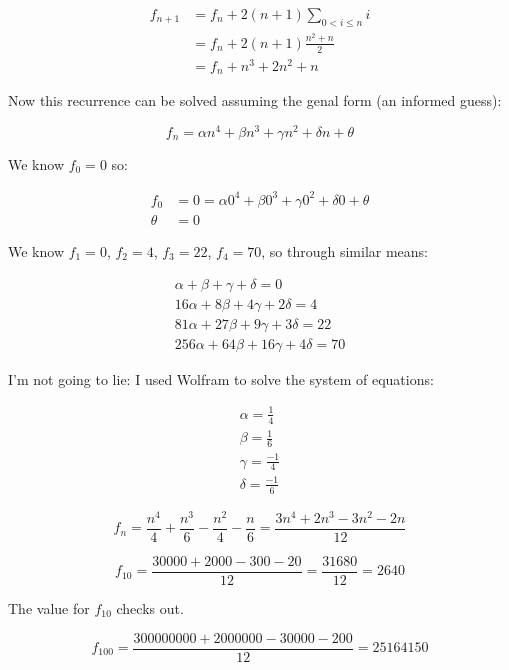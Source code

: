 \documentclass{article}
\begin{document}
\begin{align*}
    f_{n + 1} &= f_n + 2 (n + 1) \sum_{0 < i \le n} i
    \\
    &= f_n + 2 (n + 1) \frac{n^2 + n}{2}
    \\
    &= f_n + n^3 + 2n^2 + n
\end{align*}

Now this recurrence can be solved assuming the genal form (an informed guess):

\begin{equation*}
    f_n = \alpha n^4 + \beta n^3 + \gamma n^2 + \delta n + \theta
\end{equation*}

We know $f_0 = 0$ so:

\begin{align*}
    f_0 &= 0 = \alpha 0^4 + \beta 0^3 + \gamma 0^2 + \delta 0 + \theta
    \\
    \theta &= 0
\end{align*}

We know $f_1 = 0$, $f_2 = 4$, $f_3 = 22$, $f_4 = 70$, so through
 similar means:

\begin{align*}
    \alpha + \beta + \gamma + \delta = 0
    \\
    16 \alpha + 8 \beta + 4 \gamma + 2 \delta = 4
    \\
    81 \alpha + 27 \beta + 9 \gamma + 3 \delta = 22
    \\
    256 \alpha + 64 \beta + 16 \gamma + 4 \delta = 70
\end{align*}

I'm not going to lie: I used Wolfram to solve the system of equations:

\begin{align*}
    \alpha = \frac{1}{4} \\
    \beta = \frac{1}{6} \\
    \gamma = \frac{-1}{4} \\
    \delta = \frac{-1}{6}
\end{align*}

\begin{equation}
    f_n = \frac{n^4}{4} + \frac{n^3}{6} - \frac{n^2}{4} - \frac{n}{6}
    = \frac{3n^4 + 2n^3 - 3n^2 - 2n}{12} 
\end{equation}

\begin{equation*}
    f_{10} = \frac{30000 + 2000 - 300 - 20}{12} = \frac{31680}{12} = 2640
\end{equation*}

The value for $f_{10}$ checks out.

\begin{equation*}
    f_{100} = \frac{300000000 + 2000000 - 30000 - 200}{12} = 25164150
\end{equation*}
\end{document}
